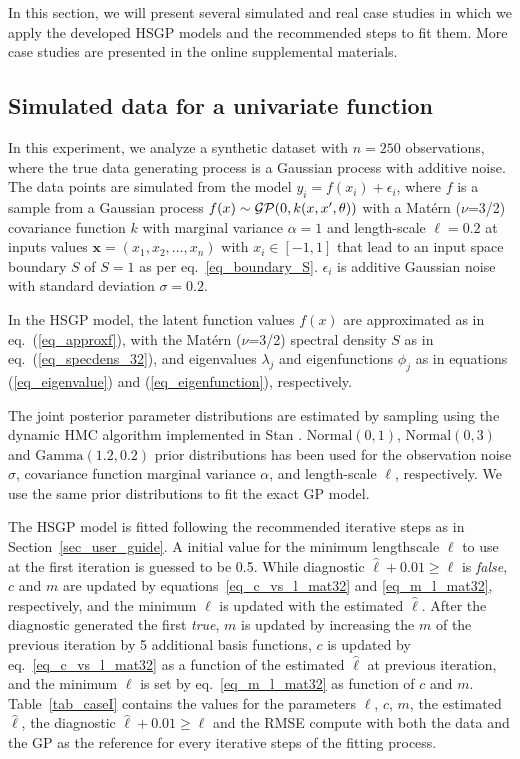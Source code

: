 In this section, we will present several simulated and real case studies in which we apply the developed HSGP models and the recommended steps to fit them. More case studies are presented in the online supplemental materials.

\subsection{Simulated data for a univariate function}\label{sec_univariate_simu}

In this experiment, we analyze a synthetic dataset with $n = 250$ observations, where the true data generating process is a Gaussian process with additive noise. The data points are simulated from the model $y_i = f(x_i) + \epsilon_i$, where $f$ is a sample from a Gaussian process $f(x) \sim \operatorname{\mathcal{GP}}(0, k(x, x', \theta))$ with a Mat{\'e}rn ($\nu$=3/2) covariance function $k$ with marginal variance $\alpha=1$ and length-scale $\ell=0.2$ at inputs values $\bm{x}=(x_1,x_2,\dots,x_n)$ with $x_i \in [-1,1]$ {\color{blue} that lead to an input space boundary $S$ of $S=1$ as per eq.~\eqref{eq_boundary_S}}. $\epsilon_i$ is additive Gaussian noise with standard deviation $\sigma=0.2$. 

In the HSGP model, the latent function values $f(x)$ are approximated as in eq.~(\ref{eq_approxf}), with the Mat{\'e}rn ($\nu$=3/2) spectral density $S$ as in eq.~(\ref{eq_specdens_32}), and eigenvalues $\lambda_j$ and eigenfunctions $\phi_j$ as in equations (\ref{eq_eigenvalue}) and (\ref{eq_eigenfunction}), respectively.  

The joint posterior parameter distributions are estimated by sampling using the dynamic HMC algorithm implemented in Stan \citep{StanTeam:2021}. $\mathrm{Normal}(0,1)$, \linebreak $\mathrm{Normal}(0,3)$ and $\mathrm{Gamma}(1.2,0.2)$ prior distributions has been used for the observation noise $\sigma$, covariance function marginal variance $\alpha$, and length-scale $\ell$, respectively. We use the same prior distributions to fit the exact GP model.

The HSGP model is fitted following the recommended iterative steps as in Section~\ref{sec_user_guide}. A initial value for the minimum lengthscale $\ell$ to use at the first iteration is guessed to be 0.5. While diagnostic $\hat{\ell} + 0.01 \geq \ell$ is \textit{false}, $c$ and $m$ are updated by equations~\eqref{eq_c_vs_l_mat32} and \eqref{eq_m_l_mat32}, respectively, and the minimum $\ell$ is updated with the estimated $\hat{\ell}$. After the diagnostic generated the first \textit{true}, $m$ is updated by increasing the $m$ of the previous iteration by 5 additional basis functions, $c$ is updated by eq.~\eqref{eq_c_vs_l_mat32} as a function of the estimated $\hat{\ell}$ at previous iteration, and the minimum $\ell$ is set by eq.~\eqref{eq_m_l_mat32} as function of $c$ and $m$. Table~\ref{tab_caseI} contains the values for the parameters $\ell$, $c$, $m$, the estimated $\hat{\ell}$, the diagnostic $\hat{\ell} + 0.01 \geq \ell$ and the RMSE compute with both the data and the GP as the reference for every iterative steps of the fitting process.

